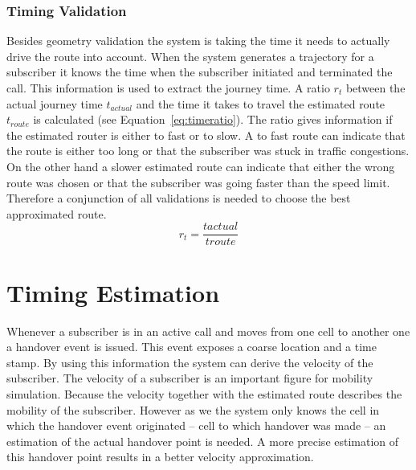 \subsubsection{Timing Validation}
Besides geometry validation the system is taking the time it needs to actually drive the route into account. When the system generates a trajectory for a subscriber it knows the time when the subscriber initiated and terminated the call. This information is used to extract the journey time. A ratio $r_t$ between the actual journey time $t_{actual}$ and the time it takes to travel the estimated route $t_{route}$ is calculated (see Equation~\ref{eq:timeratio}). The ratio gives information if the estimated router is either to fast or to slow. A to fast route can indicate that the route is either too long or that the subscriber was stuck in traffic congestions. On the other hand a slower estimated route can indicate that either the wrong route was chosen or that the subscriber was going faster than the speed limit. Therefore a conjunction of all validations is needed to choose the best approximated route.
\begin{equation}
	r_{t}=\frac{t{actual}}{t{route}}
	\label{eq:timeratio}
\end{equation}
\section{Timing Estimation}
\label{sec:timing-estimation}
Whenever a subscriber is in an active call and moves from one cell to another one a handover event is issued. This event exposes a coarse location and a time stamp. By using this information the system can derive the velocity of the subscriber. The velocity of a subscriber is an important figure for mobility simulation. Because the velocity together with the estimated route describes the mobility of the subscriber. However as we the system only knows the cell in which the handover event originated -- cell to which handover was made -- an estimation of the actual handover point is needed. A more precise estimation of this handover point results in a better velocity approximation.
